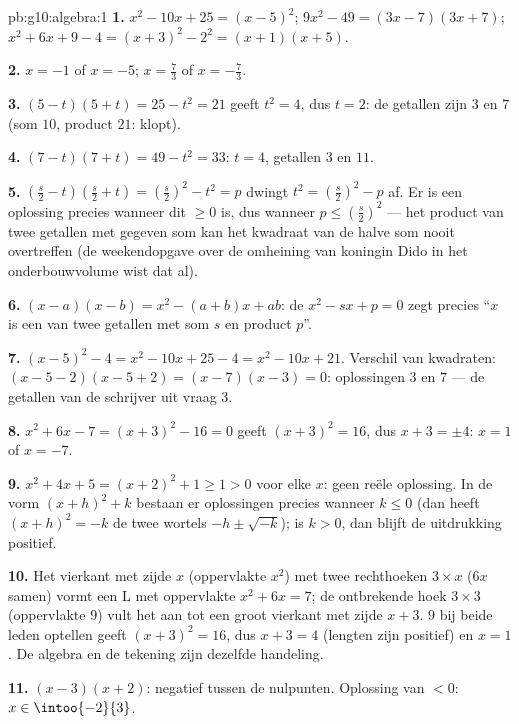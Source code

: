\begin{solution}{pb:g10:algebra:1}
\textbf{1.} $x^2 - 10x + 25 = (x - 5)^2$;
$9x^2 - 49 = (3x - 7)(3x + 7)$;
$x^2 + 6x + 9 - 4 = (x + 3)^2 - 2^2 = (x + 1)(x + 5)$.

\textbf{2.} $x = -1$ of $x = -5$; \quad $x = \frac73$ of $x = -\frac73$.

\textbf{3.} $(5 - t)(5 + t) = 25 - t^2 = 21$ geeft $t^2 = 4$, dus $t = 2$: de
getallen zijn $3$ en $7$ (som $10$, product $21$: klopt).

\textbf{4.} $(7 - t)(7 + t) = 49 - t^2 = 33$: $t = 4$, getallen $3$ en $11$.

\textbf{5.} $\left(\frac s2 - t\right)\left(\frac s2 + t\right)
= \left(\frac s2\right)^2 - t^2 = p$ dwingt
$t^2 = \left(\frac s2\right)^2 - p$ af. Er is een oplossing precies wanneer
dit $\geq 0$ is, dus wanneer $p \leq \left(\frac s2\right)^2$ --- het product
van twee getallen met gegeven som kan het kwadraat van de halve som nooit
overtreffen (de weekendopgave over de omheining van koningin Dido in het
onderbouwvolume wist dat al).

\textbf{6.} $(x - a)(x - b) = x^2 - (a + b)x + ab$: de 
$x^2 - sx + p = 0$ zegt precies ``$x$ is een van twee getallen met som $s$ en
product $p$''.

\textbf{7.} $(x-5)^2 - 4 = x^2 - 10x + 25 - 4 = x^2 - 10x + 21$. Verschil van
kwadraten: $(x - 5 - 2)(x - 5 + 2) = (x - 7)(x - 3) = 0$: oplossingen $3$ en
$7$ --- de getallen van de schrijver uit vraag 3.

\textbf{8.} $x^2 + 6x - 7 = (x + 3)^2 - 16 = 0$ geeft $(x + 3)^2 = 16$, dus
$x + 3 = \pm 4$: $x = 1$ of $x = -7$.

\textbf{9.} $x^2 + 4x + 5 = (x + 2)^2 + 1 \geq 1 > 0$ voor elke $x$: geen
reële oplossing. In de vorm $(x + h)^2 + k$ bestaan er oplossingen precies
wanneer $k \leq 0$ (dan heeft $(x+h)^2 = -k$ de twee wortels
$-h \pm \sqrt{-k}$); is $k > 0$, dan blijft de uitdrukking positief.

\textbf{10.} Het vierkant met zijde $x$ (oppervlakte $x^2$) met twee
rechthoeken $3 \times x$ ($6x$ samen) vormt een L met oppervlakte
$x^2 + 6x = 7$; de ontbrekende hoek $3 \times 3$ (oppervlakte $9$) vult het
aan tot een groot vierkant met zijde $x + 3$. $9$ bij beide leden optellen
geeft $(x + 3)^2 = 16$, dus $x + 3 = 4$ (lengten zijn positief) en $x = 1$.
De algebra en de tekening zijn dezelfde handeling.

\textbf{11.} $(x-3)(x+2)$: negatief tussen de nulpunten. Oplossing van
$< 0$: $x \in \intoo{-2}{3}$.


\end{solution}
